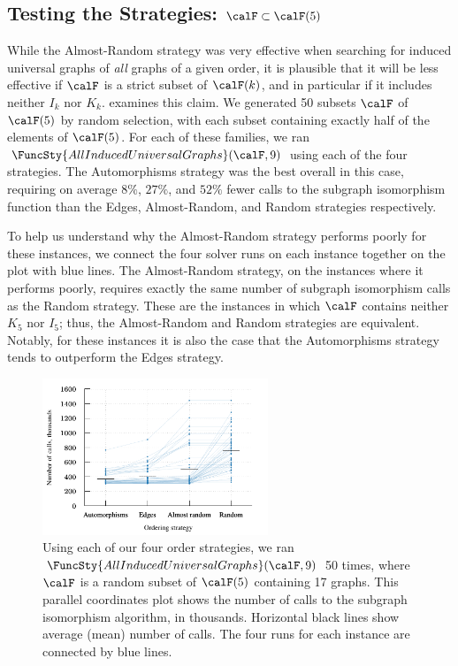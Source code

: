 

\subsection{Testing the Strategies: $\calF \subset \calF(5)$}

While the Almost-Random strategy was very effective when searching
for induced universal graphs of \emph{all} graphs of a given order,
it is plausible that it will be less effective if $\calF$ is a strict
subset of $\calF(k)$, and in particular if it includes
neither $I_k$ nor $K_k$.  
examines this claim.  We generated 50 subsets $\calF$ of $\calF(5)$ by random selection,
with each subset containing exactly half of the elements of $\calF(5)$.
For each of these families, we ran $\FuncSty{AllInducedUniversalGraphs}(\calF,9)$
using each of the four strategies.  The Automorphisms strategy
was the best overall in this case, requiring on average $8\%$, $27\%$, and $52\%$
fewer calls to the subgraph isomorphism function than the Edges, Almost-Random,
and Random strategies respectively.

To help us understand why the Almost-Random
strategy performs poorly for these instances, we connect the four solver runs on
each instance together on the plot with blue lines.  The Almost-Random
strategy, on the instances where it performs poorly, requires
exactly the same number of subgraph isomorphism calls as the Random strategy.
These are the instances in which $\calF$ contains neither $K_5$ nor $I_5$;
thus, the Almost-Random and Random strategies are equivalent.  Notably,
for these instances it is also the case that the Automorphisms strategy
tends to outperform the Edges strategy.

\begin{figure}[htb]
    \centering

    \includegraphics*[width=0.601\textwidth]{15-universal-graphs/img/second-experiment-plot-using-sample}

    \caption{Using each of our four order strategies, we ran
        $\FuncSty{AllInducedUniversalGraphs}(\calF,9)$ 50 times, where
        $\calF$ is a random subset of $\calF(5)$ containing 17 graphs. This
        parallel coordinates plot
        shows the number of calls to the subgraph isomorphism algorithm, in thousands.
        Horizontal black lines show average (mean) number of calls.  The four runs for
        each instance are connected by blue lines.}
\label{fig:second-experiment-using-sample}
\end{figure}

